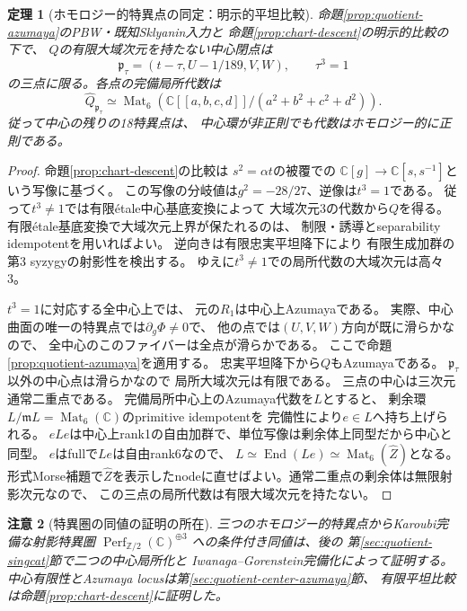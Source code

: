 \documentclass[11pt,a4paper]{ltjsarticle}
\newtheorem{theorem}{定理}[section]
\newtheorem{remark}[theorem]{注意}
\newcommand{\CC}{\mathbb C}
\newcommand{\Mat}{\operatorname{Mat}}
\begin{document}
\begin{theorem}[ホモロジー的特異点の同定：明示的平坦比較]
\label{thm:three-homological}
命題\ref{prop:quotient-azumaya}のPBW・既知Sklyanin入力と
命題\ref{prop:chart-descent}の明示的比較の下で、
$Q$の有限大域次元を持たない中心閉点は
\[
 \mathfrak p_\tau=(t-\tau,U-1/189,V,W),\qquad \tau^3=1
\]
の三点に限る。各点の完備局所代数は
\[
 \widehat Q_{\mathfrak p_\tau}\simeq
 \Mat_6\!\left(
   \CC[[a,b,c,d]]/(a^2+b^2+c^2+d^2)
 \right).
\]
従って中心の残りの18特異点は、
中心環が非正則でも代数はホモロジー的に正則である。
\end{theorem}
\begin{proof}
命題\ref{prop:chart-descent}の比較は
$s^2=\alpha t$の被覆での
$\CC[g]\to\CC[s,s^{-1}]$という写像に基づく。
この写像の分岐値は$g^2=-28/27$、逆像は$t^3=1$である。
従って$t^3\ne1$では有限\'etale中心基底変換によって
大域次元3の代数から$Q$を得る。
有限\'etale基底変換で大域次元上界が保たれるのは、
制限・誘導とseparability idempotentを用いればよい。
逆向きは有限忠実平坦降下により
有限生成加群の第3 syzygyの射影性を検出する。
ゆえに$t^3\ne1$での局所代数の大域次元は高々3。

$t^3=1$に対応する全中心上では、
元の$R_1$は中心上Azumayaである。
実際、中心曲面の唯一の特異点では$\partial_g\Phi\ne0$で、
他の点では$(U,V,W)$方向が既に滑らかなので、
全中心のこのファイバーは全点が滑らかである。
ここで命題\ref{prop:quotient-azumaya}を適用する。
忠実平坦降下から$Q$もAzumayaである。
$\mathfrak p_\tau$以外の中心点は滑らかなので
局所大域次元は有限である。
三点の中心は三次元通常二重点である。
完備局所中心上のAzumaya代数を$L$とすると、
剰余環$L/\mathfrak mL=\Mat_6(\CC)$のprimitive idempotentを
完備性により$e\in L$へ持ち上げられる。
$eLe$は中心上rank1の自由加群で、単位写像は剰余体上同型だから中心と同型。
$e$はfullで$Le$は自由rank6なので、
$L\simeq\operatorname{End}(Le)\simeq\Mat_6(\widehat Z)$となる。
形式Morse補題で$\widehat Z$を表示したnodeに直せばよい。通常二重点の剰余体は無限射影次元なので、
この三点の局所代数は有限大域次元を持たない。
\end{proof}
\begin{remark}[特異圏の同値の証明の所在]
三つのホモロジー的特異点からKaroubi完備な射影特異圏
$\operatorname{Perf}_{\mathbb Z/2}(\CC)^{\oplus3}$
への条件付き同値は、後の
第\ref{sec:quotient-singcat}節で二つの中心局所化と
Iwanaga--Gorenstein完備化によって証明する。
中心有限性とAzumaya locusは第\ref{sec:quotient-center-azumaya}節、
有限平坦比較は命題\ref{prop:chart-descent}に証明した。
\end{remark}
\end{document}
